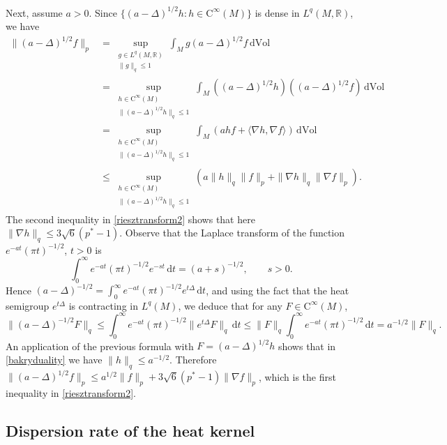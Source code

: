 \documentclass[11pt,a4paper]{article}
\theoremstyle{definition}
\begin{document}
Next, assume $a>0$. Since $\{ (a-\Delta)^{1/2} h : h \in \mathrm{C}^{\infty}(M) \}$ is dense in $L^q (M,\mathbb{R})$, we have
\begin{equation}\label{bakryduality}
\begin{split} \| (a-\Delta)^{1/2} f \|_p &= \sup_{\substack{g \in L^q (M,\mathbb{R}) \\ \| g \|_q \le 1}} \int_M g (a-\Delta)^{1/2} f \, \mathrm{d}\mathrm{Vol} \\ &= \sup_{\substack{h \in \mathrm{C}^{\infty} (M) \\ \| (a-\Delta)^{1/2} h \|_q \le 1}} \int_M \left( (a-\Delta)^{1/2} h \right) \left( (a-\Delta)^{1/2} f \right) \, \mathrm{d} \mathrm{Vol} \\ &= \sup_{\substack{h \in \mathrm{C}^{\infty} (M) \\ \| (a-\Delta)^{1/2} h \|_q \le 1}} \int_M \left( ahf+ \langle \nabla h, \nabla f \rangle \right) \, \mathrm{d}\mathrm{Vol} \\ &\le \sup_{\substack{h \in \mathrm{C}^{\infty} (M) \\ \| (a-\Delta)^{1/2} h \|_q \le 1}} \left( a \| h \|_q \| f \|_p + \| \nabla h \|_q \| \nabla f \|_p \right) . \end{split}
\end{equation}
The second inequality in \eqref{riesztransform2} shows that here $\| \nabla h \|_q \le 3 \sqrt{6} (p^*-1)$. Observe that the Laplace transform of the function $e^{-at} (\pi t)^{-1/2}$, $t>0$ is
\[ \int_0^{\infty} e^{-at} (\pi t)^{-1/2} e^{-st} \, \mathrm{d}t = (a+s)^{-1/2}, \qquad s>0. \]
Hence $(a-\Delta)^{-1/2} = \int_0^{\infty} e^{-at} (\pi t)^{-1/2} e^{t \Delta} \, \mathrm{d}t$, and using the fact that the heat semigroup $e^{t\Delta}$ is contracting in $L^q (M)$, we deduce that for any $F \in \mathrm{C}^{\infty}(M)$,
\[ \| (a-\Delta)^{-1/2} F \|_q \le \int_0^{\infty} e^{-at} (\pi t)^{-1/2} \| e^{t\Delta} F \|_q \, \mathrm{d}t \le \| F \|_q \int_0^{\infty} e^{-at} (\pi t)^{-1/2} \, \mathrm{d}t = a^{-1/2} \| F \|_q . \]
An application of the previous formula with $F=(a-\Delta)^{1/2} h$ shows that in \eqref{bakryduality} we have $\| h \|_q \le a^{-1/2}$. Therefore $\| (a-\Delta)^{1/2} f \|_p \le a^{1/2} \| f \|_p + 3\sqrt{6} (p^*-1) \| \nabla f \|_p$, which is the first inequality in \eqref{riesztransform2}.

\subsection{Dispersion rate of the heat kernel}
\end{document}
